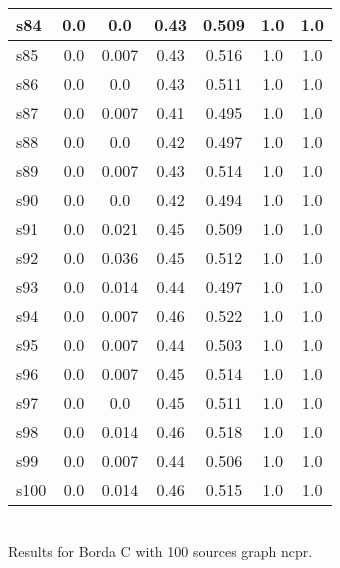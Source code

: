 \documentclass{article}
\begin{document}
\begin{tabular}{|l|c|c|c|c|c|c|}
\hline
s84 &0.0 & 0.0 & 0.43 & 0.509 & 1.0 & 1.0\\
\hline
s85 &0.0 & 0.007 & 0.43 & 0.516 & 1.0 & 1.0\\
\hline
s86 &0.0 & 0.0 & 0.43 & 0.511 & 1.0 & 1.0\\
\hline
s87 &0.0 & 0.007 & 0.41 & 0.495 & 1.0 & 1.0\\
\hline
s88 &0.0 & 0.0 & 0.42 & 0.497 & 1.0 & 1.0\\
\hline
s89 &0.0 & 0.007 & 0.43 & 0.514 & 1.0 & 1.0\\
\hline
s90 &0.0 & 0.0 & 0.42 & 0.494 & 1.0 & 1.0\\
\hline
s91 &0.0 & 0.021 & 0.45 & 0.509 & 1.0 & 1.0\\
\hline
s92 &0.0 & 0.036 & 0.45 & 0.512 & 1.0 & 1.0\\
\hline
s93 &0.0 & 0.014 & 0.44 & 0.497 & 1.0 & 1.0\\
\hline
s94 &0.0 & 0.007 & 0.46 & 0.522 & 1.0 & 1.0\\
\hline
s95 &0.0 & 0.007 & 0.44 & 0.503 & 1.0 & 1.0\\
\hline
s96 &0.0 & 0.007 & 0.45 & 0.514 & 1.0 & 1.0\\
\hline
s97 &0.0 & 0.0 & 0.45 & 0.511 & 1.0 & 1.0\\
\hline
s98 &0.0 & 0.014 & 0.46 & 0.518 & 1.0 & 1.0\\
\hline
s99 &0.0 & 0.007 & 0.44 & 0.506 & 1.0 & 1.0\\
\hline
s100 &0.0 & 0.014 & 0.46 & 0.515 & 1.0 & 1.0\\
\hline
\end{tabular}\\

\noindent Results for Borda C with 100 sources graph ncpr.
\end{document}
